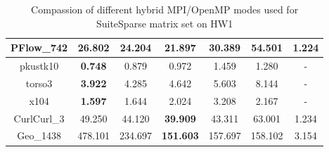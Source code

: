 \begin{table}[h!]
\begin{tabular}{|c|c|c|c|c|c|c|}
PFlow\_742                                            & 26.802                                                    & 24.204                                                     & \textbf{21.897}                                           & 30.389                                                     & 54.501                                                     & 1.224                                                            \\ \hline
pkustk10                                              & \textbf{0.748}                                            & 0.879                                                      & 0.972                                                     & 1.459                                                      & 1.280                                                      & -                                                                \\ \hline
torso3                                                & \textbf{3.922}                                            & 4.285                                                      & 4.642                                                     & 5.603                                                      & 8.144                                                      & -                                                                \\ \hline
x104                                                  & \textbf{1.597}                                            & 1.644                                                      & 2.024                                                     & 3.208                                                      & 2.167                                                      & -                                                                \\ \hline
CurlCurl\_3                                           & 49.250                                                    & 44.120                                                     & \textbf{39.909}                                           & 43.311                                                     & 63.001                                                     & 1.234                                                            \\ \hline
Geo\_1438                                             & 478.101                                                   & 234.697                                                    & \textbf{151.603}                                          & 157.697                                                    & 158.102                                                    & 3.154                                                            \\ \hline
\end{tabular}
\caption{Compassion of different hybrid MPI/OpenMP modes used for SuiteSparse matrix set on HW1}
\label{fig:mpi-omp-suitesparse-hw1}
\end{table}




